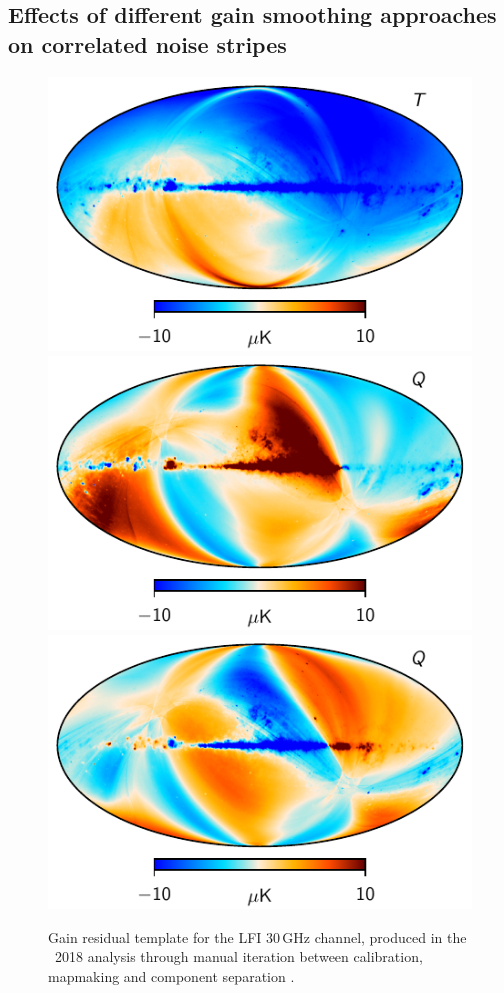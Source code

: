 \documentclass[twocolumn]{aa}
\newcommand{\BP}{\textsc{BeyondPlanck}}
\begin{document}

\subsection{Effects of different gain smoothing approaches on correlated noise stripes}

\begin{figure}[p]
  \center
  \includegraphics[width=0.27\linewidth]{figs/LFI_gain_template_030_T.pdf}
  \includegraphics[width=0.27\linewidth]{figs/LFI_gain_template_030_Q.pdf}
  \includegraphics[width=0.27\linewidth]{figs/LFI_gain_template_030_U.pdf}
    \caption{Gain residual template for the LFI 30\,GHz channel, produced in the \Planck\ 2018 analysis through manual iteration between calibration, mapmaking and component separation \citep{planck2016-l02}.
    }
  \label{fig:gain_template}


  \vspace*{1cm}
  

\end{figure}
\end{document}
